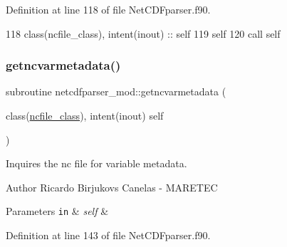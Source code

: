 Definition at line 118 of file Net\+C\+D\+Fparser.\+f90.


\begin{DoxyCode}
118     \textcolor{keywordtype}{class}(ncfile\_class), \textcolor{keywordtype}{intent(inout)} :: self
119     self%
120     \textcolor{keyword}{call }self%
\end{DoxyCode}
\mbox{\label{namespacenetcdfparser__mod_a46989199271acb6205cc61ac413d5a56}} 
\subsubsection{\texorpdfstring{getncvarmetadata()}{getncvarmetadata()}}
{\footnotesize\ttfamily subroutine netcdfparser\+\_\+mod\+::getncvarmetadata (\begin{DoxyParamCaption}\item[{class(\mbox{\hyperlink{structnetcdfparser__mod_1_1ncfile__class}{ncfile\+\_\+class}}), intent(inout)}]{self }\end{DoxyParamCaption})\hspace{0.3cm}{\ttfamily [private]}}



Inquires the nc file for variable metadata. 

\begin{DoxyAuthor}{Author}
Ricardo Birjukovs Canelas -\/ M\+A\+R\+E\+T\+EC 
\end{DoxyAuthor}

\begin{DoxyParams}[1]{Parameters}
\mbox{\tt in}  & {\em self} & \\
\hline
\end{DoxyParams}


Definition at line 143 of file Net\+C\+D\+Fparser.\+f90.


